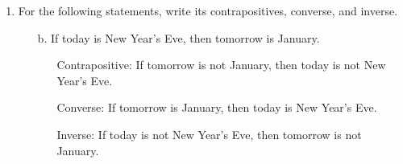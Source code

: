 \documentclass[12pt]{article}
\newcommand{\T}[0]{\top}
\newcommand{\F}[0]{\bot}
\begin{document}
\begin{enumerate}
\begin{proof}[Proof 1]
            \begin{align*}
            \text{let } & \text{$p$ be a statement variable}\\
                & p \oplus p \\
                \equiv & (p \vee p ) \wedge \neg (p \wedge p) & \text{By Definition}\\
                \equiv & p \wedge \neg p & \text{Idempotence} \\
                \equiv & \F & \text{Negation Law}
            \end{align*}
        \end{proof}
        \begin{proof}[Proof 2]
            \[
            \therefore p \oplus p \equiv \F
            \]
            \begin{align*}
                & (p \oplus p) \oplus p \\
                \equiv & \F \oplus p & \text{by Proof 1}\\
                \equiv & (\F \vee p ) \wedge \neg (\F \wedge p) & \text{By Definition}\\
                \equiv & (p \vee \F ) \wedge \neg ( p \wedge \F ) & \text{Commutativity}\\
                \equiv & p \wedge \neg ( p \wedge \F) & \text{Identity Law} \\
                \equiv & p \wedge \neg \F & \text{Universal Bound}\\
                \equiv & p \wedge \T & \text{Contradiction Negation}\\
                \equiv & p & \text{Identity Law}
            \end{align*}
            \[
            \therefore (p \oplus p) \oplus p \equiv p
            \]
        \end{proof}
    \newpage
    \item For the following statements, write its contrapositives, converse, and inverse.
        \begin{enumerate}
            \item[b.] If today is New Year's Eve, then tomorrow is January.
                \begin{enumerate}
                    \item[Contrapositive:] If tomorrow is not January, then today is not New Year's Eve. 
                    \item[Converse:] If tomorrow is January, then today is New Year's Eve.
                    \item[Inverse:] If today is not New Year's Eve, then tomorrow is not January.

\end{enumerate}
\end{enumerate}
\end{enumerate}
\end{document}
